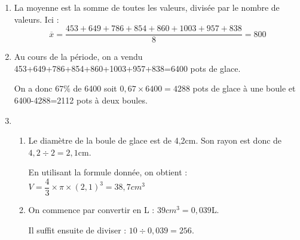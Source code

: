 \begin{enumerate}
    \vspace*{1em}\item La moyenne est la somme de toutes les valeurs, divisée par le nombre de valeurs. Ici :
    $$\overline{x}=\dfrac{453+649+786+854+860+1003+957+838}{8}=800$$

    \vspace*{1em}\item Au cours de la période, on a vendu 453+649+786+854+860+1003+957+838=6400 pots de glace.
    
    On a donc $67\%$ de 6400 soit $0,67\times 6400=4288$ pots de glace à une boule et 6400-4288=2112 pots à deux boules. 


    \vspace*{1em}\item \begin{enumerate}[label=\alph*.]
        \vspace*{1em}\item Le diamètre de la boule de glace est de 4,2cm. Son rayon est donc de $4,2\div 2=2,1$cm.
        
        En utilisant la formule donnée, on obtient : $V=\dfrac{4}{3}\times\pi\times (2,1)^3=38,7cm^3$

        \vspace*{1em}\item On commence par convertir en L : $39cm^3=0,039$L.
        
        Il suffit ensuite de diviser : $10\div 0,039=256$. 
    \end{enumerate}
\end{enumerate}


